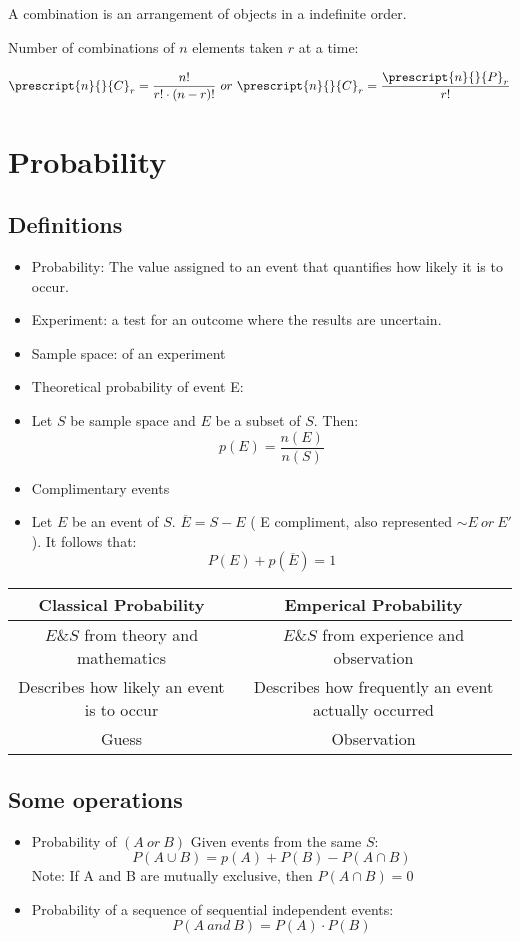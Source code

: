\documentclass[openany]{book}
\begin{document}
A combination is an arrangement of objects in a indefinite order.

Number of combinations of \(n\) elements taken \(r\) at a time:

\[ \prescript{n}{}{C}_r = \dfrac{n!}{r! \cdot (n-r)!}\ or\ \prescript{n}{}{C}_r = \dfrac{\prescript{n}{}{P}_r}{r!} \]

\part{Probability}

\chapter{Definitions}

\begin{itemize}
	\item Probability: The value assigned to an event that quantifies how likely it is to occur.
	\item Experiment: a test for an outcome where the results are uncertain.
	\item Sample space: of an experiment
	\item Theoretical probability of event E:
	\item Let \(S\) be sample space and \(E\) be a subset of \(S\). Then:
	      \[p(E)=\dfrac{n(E)}{n(S)}\]
	\item Complimentary events
	\item Let \(E\) be an event of \(S\). \(\overline{E}=S-E\) ( E compliment, also represented \(\sim E\ or\ E'\)). It follows that:
	      \[
		      P(E)+p(\overline{E})=1
	      \]
	      
\end{itemize}
\begin{tabular}{|c|c|}
	\hline
	Classical Probability                     & 
	Emperical Probability                               \\
	\hline
	\(E \& S\) from theory and mathematics    & 
	\(E \& S\) from experience and observation          \\
	Describes how likely an event is to occur & 
	Describes how frequently an event actually occurred \\
	Guess                                     & 
	Observation                                         \\
	\hline
\end{tabular}

\chapter{Some operations}

\begin{itemize}
	\item Probability of \((A\ or\ B)\)
	      Given events from the same \(S\):
	      \[
		      P(A \cup B)=p(A)+P(B)-P(A \cap B)
	      \]
	      Note: If A and B are mutually exclusive, then \(P(A \cap B)=0\)
	\item Probability of a sequence of sequential independent events:
	      \[P(A\ and\ B)=P(A)\cdot P(B)\]
\end{itemize}
\end{document}
